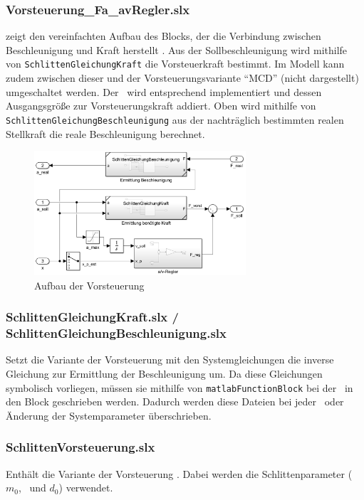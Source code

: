 \subsubsection{Vorsteuerung\_Fa\_avRegler.slx}
 zeigt den vereinfachten Aufbau des Blocks, der die Verbindung zwischen Beschleunigung und Kraft herstellt .
Aus der Sollbeschleunigung wird mithilfe von \texttt{SchlittenGleichungKraft} die Vorsteuerkraft bestimmt.
Im Modell kann zudem zwischen dieser und der Vorsteuerungsvariante "`MCD"' (nicht dargestellt) umgeschaltet werden.
Der \avr\ wird entsprechend  implementiert und dessen Ausgangsgröße zur Vorsteuerungskraft addiert.
Oben wird mithilfe von \texttt{SchlittenGleichungBeschleunigung} aus der nachträglich bestimmten realen Stellkraft die reale Beschleunigung berechnet.

\begin{figure}[htb]
	\centering
		\includegraphics[width=0.7\textwidth]{Bilder/Simulink/Fa_vorst.PNG}
	\caption{Aufbau der Vorsteuerung}
	\label{fig:simfav}
\end{figure}

\subsubsection{SchlittenGleichungKraft.slx / SchlittenGleichungBeschleunigung.slx}
Setzt die Variante der Vorsteuerung mit den Systemgleichungen  \bzw die inverse Gleichung zur Ermittlung der Beschleunigung um.
Da diese Gleichungen symbolisch vorliegen, müssen sie mithilfe von \texttt{matlabFunctionBlock} bei der \init\ in den Block geschrieben werden.
Dadurch werden diese Dateien bei jeder \init\ oder Änderung der Systemparameter überschrieben.

\subsubsection{SchlittenVorsteuerung.slx}
Enthält die  Variante der Vorsteuerung .
Dabei werden die Schlittenparameter ($m_0$, \Fco\ und $d_0$) verwendet. 

